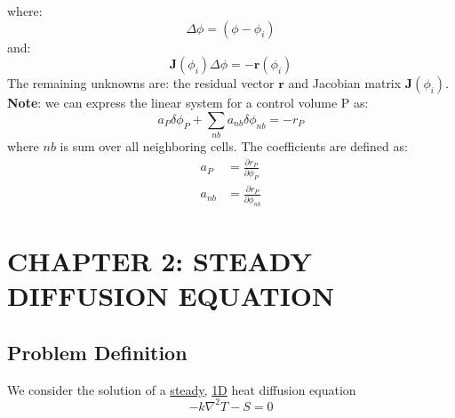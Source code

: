 \documentclass[11pt]{article}
\begin{document}
where:
\begin{equation}
\Delta \phi = (\phi - \phi_i)
\end{equation}
and:
\begin{equation}
\textbf{J}(\phi_i)\Delta \phi = -\textbf{r}(\phi_i)
\end{equation}
The remaining unknowns are: the residual vector \(\textbf{r}\) and Jacobian matrix \(\textbf{J}(\phi_i)\).\\
\textbf{Note}: we can express the linear system for a control volume P as:
\begin{equation}
a_P\delta \phi_P + \sum_{nb} a_{nb}\delta \phi_{nb} = -r_P
\end{equation}
where \(nb\) is sum over all neighboring cells.  The coefficients are defined as:
\begin{align}
a_P &= \frac{\partial r_P}{\partial \phi_P}\\
a_{nb} &= \frac{\partial r_P}{\partial \phi_{nb}}
\end{align}
\section{CHAPTER 2: STEADY DIFFUSION EQUATION}
\label{sec:org9db38d7}
\subsection{Problem Definition}
\label{sec:org2c6b4eb}
We consider the solution of a \uline{steady}, \uline{1D} heat diffusion equation
\begin{equation}
-k \nabla^2 T - S = 0
\end{equation}
\end{document}
